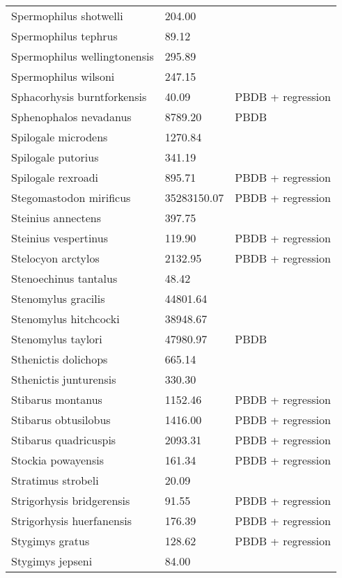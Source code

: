 \documentclass{article}
\begin{document}
\begin{center}
\begin{longtable}{p{} p{} p{} }
  Spermophilus shotwelli & 204.00 & \cite{McKenna2011} \\ 
  Spermophilus tephrus & 89.12 & \cite{Tomiya2013} \\ 
  Spermophilus wellingtonensis & 295.89 & \cite{Tomiya2013} \\ 
  Spermophilus wilsoni & 247.15 & \cite{Tomiya2013} \\ 
  Sphacorhysis burntforkensis & 40.09 & PBDB + regression \\ 
  Sphenophalos nevadanus & 8789.20 & PBDB \\ 
  Spilogale microdens & 1270.84 & \cite{Chester2012} \\ 
  Spilogale putorius & 341.19 & \cite{Smith2004} \\ 
  Spilogale rexroadi & 895.71 & PBDB + regression \\ 
  Stegomastodon mirificus & 35283150.07 & PBDB + regression \\ 
  Steinius annectens & 397.75 & \cite{Strait2001} \\ 
  Steinius vespertinus & 119.90 & PBDB + regression \\ 
  Stelocyon arctylos & 2132.95 & PBDB + regression \\ 
  Stenoechinus tantalus & 48.42 & \cite{Tomiya2013} \\ 
  Stenomylus gracilis & 44801.64 & \cite{Tomiya2013} \\ 
  Stenomylus hitchcocki & 38948.67 & \cite{Tomiya2013} \\ 
  Stenomylus taylori & 47980.97 & PBDB \\ 
  Sthenictis dolichops & 665.14 & \cite{Tomiya2013} \\ 
  Sthenictis junturensis & 330.30 & \cite{Tomiya2013} \\ 
  Stibarus montanus & 1152.46 & PBDB + regression \\ 
  Stibarus obtusilobus & 1416.00 & PBDB + regression \\ 
  Stibarus quadricuspis & 2093.31 & PBDB + regression \\ 
  Stockia powayensis & 161.34 & PBDB + regression \\ 
  Stratimus strobeli & 20.09 & \cite{Tomiya2013} \\ 
  Strigorhysis bridgerensis & 91.55 & PBDB + regression \\ 
  Strigorhysis huerfanensis & 176.39 & PBDB + regression \\ 
  Stygimys gratus & 128.62 & PBDB + regression \\ 
  Stygimys jepseni & 84.00 & \cite{Wilson2012} \\ 

\end{longtable}
\end{center}
\end{document}
